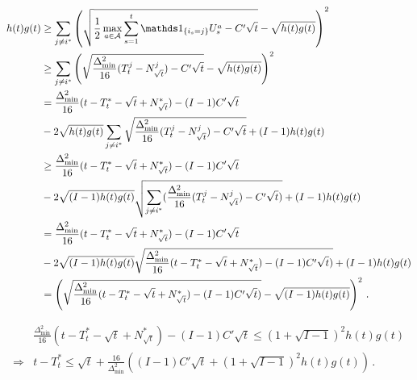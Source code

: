 \begin{align*}
    h(t)g(t) &\ge \sum_{j\neq i^*} \left(\sqrt{\frac{1}{2}\max_{a\in \mathcal A} \sum_{s=1}^t \ind_{\{i_s=j\}} U_s^a - C'\sqrt{t}} - \sqrt{h(t)g(t)}\right)^2\\
    &\ge \sum_{j\neq i^*} \left(\sqrt{\frac{\Delta_{\min}^2}{16} (T_t^j - N_{\sqrt{t}}^j) - C'\sqrt{t}} - \sqrt{h(t)g(t)}\right)^2\\
    &= \frac{\Delta_{\min}^2}{16} (t - T_t^* - \sqrt{t} + N_{\sqrt{t}}^*) - (I-1)C'\sqrt{t}\\
    &- 2\sqrt{h(t)g(t)}\sum_{j\neq i^*}\sqrt{\frac{\Delta_{\min}^2}{16} (T_t^j - N_{\sqrt{t}}^j) - C'\sqrt{t}} + (I-1)h(t)g(t)\\
    &\ge \frac{\Delta_{\min}^2}{16} (t - T_t^* - \sqrt{t} + N_{\sqrt{t}}^*) - (I-1)C'\sqrt{t}\\
    &- 2\sqrt{(I-1) h(t)g(t)}\sqrt{\sum_{j\neq i^*}(\frac{\Delta_{\min}^2}{16} (T_t^j - N_{\sqrt{t}}^j) - C'\sqrt{t})} + (I-1)h(t)g(t)\\
    &= \frac{\Delta_{\min}^2}{16} (t - T_t^* - \sqrt{t} + N_{\sqrt{t}}^*) - (I-1)C'\sqrt{t}\\
    &- 2\sqrt{(I-1) h(t)g(t)}\sqrt{\frac{\Delta_{\min}^2}{16} (t - T_t^* - \sqrt{t} + N_{\sqrt{t}}^*) - (I-1)C'\sqrt{t})} + (I-1)h(t)g(t)\\
    &= \left( \sqrt{\frac{\Delta_{\min}^2}{16} (t - T_t^* - \sqrt{t} + N_{\sqrt{t}}^*) - (I-1)C'\sqrt{t})} - \sqrt{(I-1) h(t)g(t)} \right)^2\,.
\end{align*}

\begin{align*}
    &\frac{\Delta_{\min}^2}{16} (t - T_t^* - \sqrt{t} + N_{\sqrt{t}}^*) - (I-1)C'\sqrt{t} \le (1 + \sqrt{I-1})^2 h(t)g(t)\\
    \Rightarrow
    &t - T_t^*
    \le \sqrt{t} + \frac{16}{\Delta_{\min}^2}\left((I-1)C'\sqrt{t} + (1 + \sqrt{I-1})^2 h(t)g(t)\right)\,.
\end{align*}